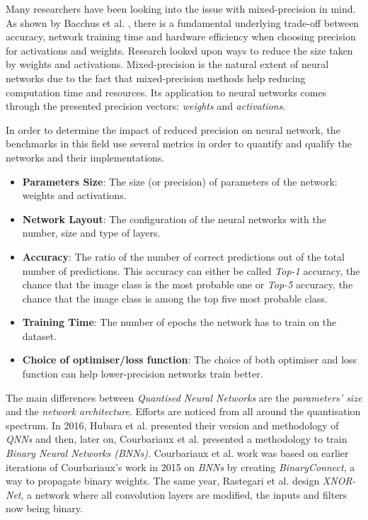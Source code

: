 Many researchers have been looking into the issue with mixed-precision in mind. As shown by Bacchus et al. \cite{Bacchus2020}, there is a fundamental underlying trade-off between accuracy, network training time and hardware efficiency when choosing precision for activations and weights. Research looked upon ways to reduce the size taken by weights and activations. Mixed-precision is the natural extent of neural networks due to the fact that mixed-precision methods help reducing computation time and resources. Its application to neural networks comes through the presented precision vectors: \emph{weights} and \emph{activations}.

In order to determine the impact of reduced precision on neural network, the benchmarks in this field use several metrics in order to quantify and qualify the networks and their implementations.
\begin{itemize}
	\item \textbf{Parameters Size}: The size (or precision) of parameters of the network: weights and activations.
	\item \textbf{Network Layout}: The configuration of the neural networks with the number, size and type of layers.
	\item \textbf{Accuracy}: The ratio of the number of correct predictions out of the total number of predictions. This accuracy can either be called \emph{Top-1} accuracy, the chance that the image class is the most probable one or \emph{Top-5} accuracy, the chance that the image class is among the top five most probable class.
	\item \textbf{Training Time}: The number of epochs the network has to train on the dataset.
  \item \textbf{Choice of optimiser/loss function}: The choice of both optimiser and loss function can help lower-precision networks train better.
\end{itemize}

The main differences between \emph{Quantised Neural Networks} are the \emph{parameters' size} and the \emph{network architecture}. Efforts are noticed from all around the quantisation spectrum. In 2016, Hubara et al. \cite{Hubara2016} presented their version and methodology of \emph{QNNs} and then, later on, Courbariaux et al. \cite{Courbariaux2016} presented a methodology to train \emph{Binary Neural Networks (BNNs)}. Courbariaux et al. work was based on earlier iterations of Courbariaux's work in 2015 \cite{Courbariaux2015} on \emph{BNNs} by creating \emph{BinaryConnect}, a way to propagate binary weights. The same year, Rastegari et al. \cite{Rastegari2016} design \emph{XNOR-Net}, a network where all convolution layers are modified, the inputs and filters now being binary.


